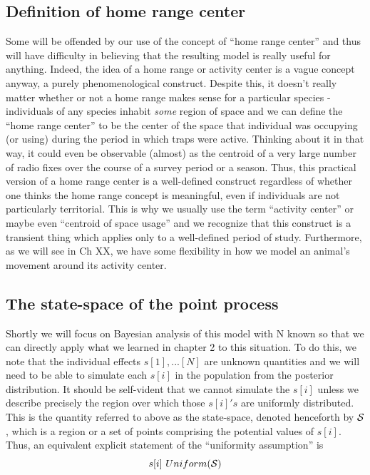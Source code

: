 \subsection{Definition of home range center}
Some will be offended by our use of the concept of ``home range center'' and thus will have difficulty in believing that the resulting model is really useful for anything.  Indeed, the idea of a home range or activity center is a vague concept anyway, a purely phenomenological construct.  Despite this, it doesn't really matter whether or not a home range makes sense for a particular species - individuals of any species inhabit {\it some} region of space and we can define the ``home range center'' to be the center of the space that individual was occupying (or using) during the period in which traps were active. Thinking about it in that way, it could even be observable (almost) as the centroid of a very large number of radio fixes over the course of a survey period or a season.   Thus, this practical version of a home range center is a well-defined construct regardless of whether one thinks the home range concept is meaningful, even if individuals are not particularly territorial.   This is why we usually use the term ``activity center'' or maybe even ``centroid of space usage'' and we recognize that this construct is a transient thing which applies only to a well-defined period of study. Furthermore, as we will see in Ch XX, we have some flexibility in how we model an animal's movement around its activity center.


\subsection{The state-space of the point process}
Shortly we will focus on Bayesian analysis of this model with N known
so that we can directly apply what we learned in chapter 2 to this
situation. To do this, we note that the individual effects $s[1],
...[N]$ are unknown quantities and we will need to be able to simulate
each $s[i]$ in the population from the posterior distribution.  It
should be self-vident that we cannot simulate the $s[i]$ unless we
describe precisely the region over which those $s[i]'s$ are uniformly distributed. This is the quantity referred to above as the state-space, denoted henceforth by ${\cal S}$, which is a region or a set of points comprising the potential values of $s[i]$. Thus, an equivalent explicit statement of the ``uniformity assumption'' is
\[
		s[i] ~ Uniform({\cal S})
\]


